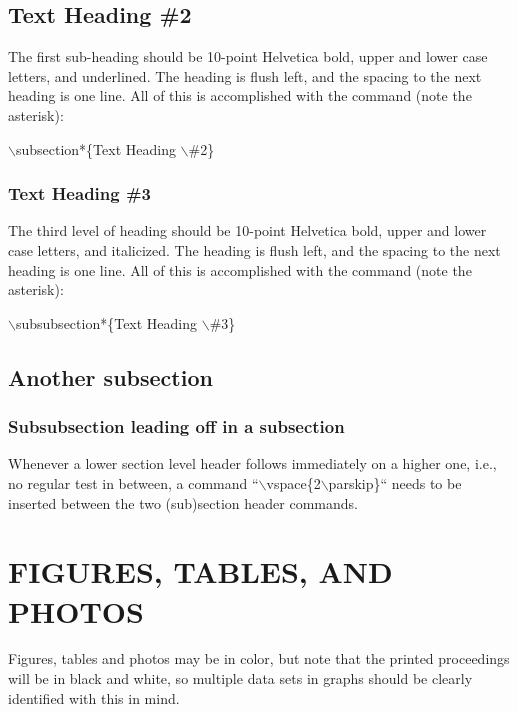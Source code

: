 \documentclass[letterpaper,10pt,twocolumn]{../aspe}
\begin{document}
\subsection*{Text Heading \#2}
The first sub-heading should be 10-point Helvetica bold, upper and lower
case letters, and underlined. The heading is flush left, and the spacing
to the next heading is one line.  All of this is accomplished with the
command (note the asterisk):

\hspace*{3mm}$\backslash$subsection*\{Text Heading $\backslash$\#2\}

\subsubsection*{Text Heading \#3}
The third level of heading should be 10-point Helvetica bold, upper and
lower case letters, and italicized. The heading is flush left, and the
spacing to the next heading is one line.  All of this is accomplished
with the command (note the asterisk):

\hspace*{3mm}$\backslash$subsubsection*\{Text Heading $\backslash$\#3\}

\subsection*{Another subsection}\vspace{2\parskip}
\subsubsection*{Subsubsection leading off in a subsection}
Whenever a lower section level header follows immediately on a higher
one, i.e., no regular test in between, a command
``$\backslash$vspace\{2$\backslash$parskip\}`` needs to be inserted
between the two (sub)section header commands.
\section*{FIGURES, TABLES, AND PHOTOS}
Figures, tables and photos may be in color, but note that the printed
proceedings will be in black and white, so multiple data sets in graphs
should be clearly identified with this in mind.
\end{document}
